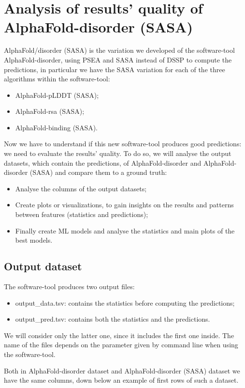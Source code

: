 \chapter{Analysis of results' quality of AlphaFold-disorder (SASA)}
\label{chp:analysis}
AlphaFold/disorder (SASA) is the variation we developed of the software-tool AlphaFold-disorder, using PSEA and SASA instead of DSSP to compute the predictions, in particular we have the SASA variation for each of the three algorithms within the software-tool:
\begin{itemize}
    \item AlphaFold-pLDDT (SASA);
    \item AlphaFold-rsa (SASA);
    \item AlphaFold-binding (SASA).
\end{itemize}

Now we have to understand if this new software-tool produces good predictions: we need to evaluate the results' quality. To do so, we will analyse the output datasets, which contain the predictions, of AlphaFold-disorder and AlphaFold-disorder (SASA) and compare them to a ground truth:
\begin{itemize}
    \item Analyse the columns of the output datasets;
    \item Create plots or visualizations, to gain insights on the results and patterns between features (statistics and predictions);
    \item Finally create ML models and analyse the statistics and main plots of the best models.
\end{itemize}

\section{Output dataset}
The software-tool produces two output files:
\begin{itemize}
    \item output\_data.tsv: contains the statistics before computing the predictions;
    \item output\_pred.tsv: contains both the statistics and the predictions.
\end{itemize}
We will consider only the latter one, since it includes the first one inside. The name of the files depends on the parameter given by command line when using the software-tool. 

Both in AlphaFold-disorder dataset and AlphaFold-disorder (SASA) dataset we have the same columns, down below an example of first rows of such a dataset.

